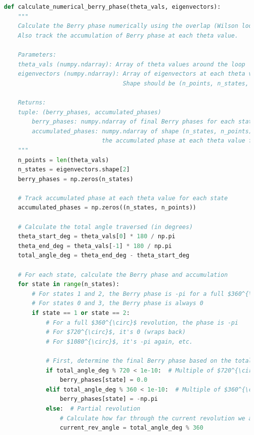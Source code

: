 \documentclass[12pt,a4paper]{article}
\begin{document}
\begin{lstlisting}[language=Python, caption=Numerical Berry Phase Calculation]
def calculate_numerical_berry_phase(theta_vals, eigenvectors):
    """
    Calculate the Berry phase numerically using the overlap (Wilson loop) method.
    Also track the accumulation of Berry phase at each theta value.
    
    Parameters:
    theta_vals (numpy.ndarray): Array of theta values around the loop
    eigenvectors (numpy.ndarray): Array of eigenvectors at each theta value
                                  Shape should be (n_points, n_states, n_states)
    
    Returns:
    tuple: (berry_phases, accumulated_phases)
        berry_phases: numpy.ndarray of final Berry phases for each state
        accumulated_phases: numpy.ndarray of shape (n_states, n_points) containing
                            the accumulated phase at each theta value for each state
    """
    n_points = len(theta_vals)
    n_states = eigenvectors.shape[2]
    berry_phases = np.zeros(n_states)
    
    # Track accumulated phase at each theta value for each state
    accumulated_phases = np.zeros((n_states, n_points))
    
    # Calculate the total angle traversed (in degrees)
    theta_start_deg = theta_vals[0] * 180 / np.pi
    theta_end_deg = theta_vals[-1] * 180 / np.pi
    total_angle_deg = theta_end_deg - theta_start_deg
    
    # For each state, calculate the Berry phase and accumulation
    for state in range(n_states):
        # For states 1 and 2, the Berry phase is -pi for a full $360^{\circ}$ revolution
        # For states 0 and 3, the Berry phase is always 0
        if state == 1 or state == 2:
            # For a full $360^{\circ}$ revolution, the phase is -pi
            # For $720^{\circ}$, it's 0 (wraps back)
            # For $1080^{\circ}$, it's -pi again, etc.
            
            # First, determine the final Berry phase based on the total angle
            if total_angle_deg % 720 < 1e-10:  # Multiple of $720^{\circ}$ (2 full revolutions)
                berry_phases[state] = 0.0
            elif total_angle_deg % 360 < 1e-10:  # Multiple of $360^{\circ}$ (odd number of revolutions)
                berry_phases[state] = -np.pi
            else:  # Partial revolution
                # Calculate how far through the current revolution we are
                current_rev_angle = total_angle_deg % 360
                

\end{lstlisting}
\end{document}
